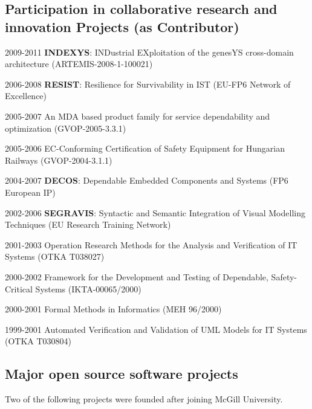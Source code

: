 \subsection{Participation in collaborative research and innovation Projects (as Contributor)}
\begin{yearlist}
\item[2009-2011] \textbf{INDEXYS}: INDustrial EXploitation of the genesYS cross-domain architecture (ARTEMIS-2008-1-100021) 
\item[2006-2008] \textbf{RESIST}: Resilience for Survivability in IST (EU-FP6 Network of Excellence)  
\item[2005-2007] An MDA based product family for service dependability and optimization (GVOP-2005-3.3.1)  
\item[2005-2006] EC-Conforming Certification of Safety Equipment for Hungarian Railways (GVOP-2004-3.1.1) 
\item[2004-2007] \textbf{DECOS}: Dependable Embedded Components and Systems (FP6 European IP) 
\item[2002-2006] \textbf{SEGRAVIS}: Syntactic and Semantic Integration of
Visual Modelling Techniques (EU Research Training Network) 
\item[2001-2003] Operation Research Methods for the Analysis and Verification of IT Systems (OTKA T038027) 
\item[2000-2002] Framework for the Development and Testing of Dependable, Safety-Critical Systems (IKTA-00065/2000) 
\item[2000-2001] Formal Methods in Informatics (MEH 96/2000) 
\item[1999-2001] Automated Verification and Validation of UML Models for IT Systems (OTKA T030804) 
\end{yearlist}



\subsection{Major open source software projects}
Two of the following projects were founded after joining McGill University.

